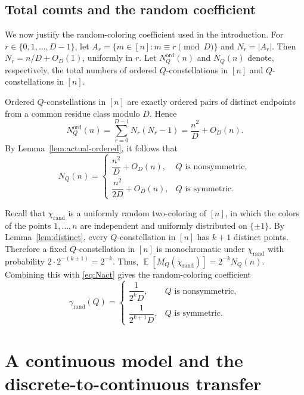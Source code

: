 \documentclass[twoside,12pt]{article}
\newcommand{\ord}{\mathrm{ord}}
\newcommand{\rand}{\mathrm{rand}}
\DeclareMathOperator{\E}{\mathbb{E}}
\newcommand{\1}{\mathbf 1}
\begin{document}
\subsection{Total counts and the random coefficient}\label{subsec:total-counts}

We now justify the random-coloring coefficient used in the introduction.  For
\(r\in\{0,1,\dots,D-1\}\), let
\(A_r=\{m\in[n]:m\equiv r\pmod D\}\) and \(N_r=|A_r|\).  Then
\(N_r=n/D+O_D(1)\), uniformly in \(r\).  Let \(N_Q^{\ord}(n)\) and \(N_Q(n)\)
denote, respectively, the total numbers of ordered \(Q\)-constellations in
\([n]\) and \(Q\)-constellations in \([n]\).

Ordered \(Q\)-constellations in \([n]\) are exactly ordered pairs of distinct
endpoints from a common residue class modulo \(D\).  Hence
\[
N_Q^{\ord}(n)=\sum_{r=0}^{D-1}N_r(N_r-1)=\frac{n^2}{D}+O_D(n).
\]
By Lemma~\ref{lem:actual-ordered}, it follows that
\begin{equation}\label{eq:Nact}
N_Q(n)=
\begin{cases}
\dfrac{n^2}{D}+O_D(n), & Q \text{ is nonsymmetric},\\[8pt]
\dfrac{n^2}{2D}+O_D(n), & Q \text{ is symmetric}.
\end{cases}
\end{equation}

Recall that \(\chi_{\rand}\) is a uniformly random two-coloring of \([n]\), in
which the colors of the points \(1,\dots,n\) are independent and uniformly
distributed on \(\{\pm1\}\).  By Lemma~\ref{lem:distinct}, every
\(Q\)-constellation in \([n]\) has \(k+1\) distinct points.  Therefore a fixed
\(Q\)-constellation in \([n]\) is monochromatic under \(\chi_{\rand}\) with
probability \(2\cdot 2^{-(k+1)}=2^{-k}\).  Thus, $\E\!\left[M_Q(\chi_{\rand})\right]=2^{-k}N_Q(n)$.
Combining this with \eqref{eq:Nact} gives the random-coloring coefficient
\begin{equation}\label{eq:Nact2}
\gamma_{\rand}(Q)=
\begin{cases}
\dfrac{1}{2^kD}, & Q \text{ is nonsymmetric},\\[8pt]
\dfrac{1}{2^{k+1}D}, & Q \text{ is symmetric}.
\end{cases}
\end{equation}

\section{A continuous model and the discrete-to-continuous transfer}
\label{sec:continuous-transfer}
\end{document}
